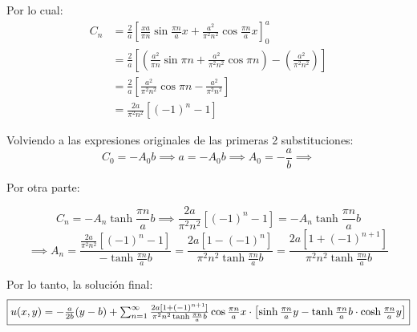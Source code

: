 \begin{solution}
Por lo cual: 
\begin{align*}
    C_n &= \frac{2}{a}\left[\frac{xa}{\pi n}\sin\frac{\pi n}{a}x+\frac{a^2}{\pi^2 n^2} \cos\frac{\pi n}{a}x \right]_0^a\\
    &= \frac{2}{a}\left[\left(\frac{a^2}{\pi n}\sin\pi n+\frac{a^2}{\pi^2 n^2} \cos\pi n\right)-\left(\frac{a^2}{\pi^2 n^2}\right) \right]\\
    &= \frac{2}{a}\left[\frac{a^2}{\pi^2 n^2} \cos\pi n-\frac{a^2}{\pi^2 n^2} \right]\\
    &= \frac{2a}{\pi^2 n^2}\left[(-1)^n-1 \right]
\end{align*}

\linita 

Volviendo a las expresiones originales de las primeras 2 substituciones: 
$$C_0 = -A_0b \implies a= -A_0 b \implies A_0=-\frac{a}{b}\implies $$
 
Por otra parte: 

$$C_n= -A_n\tanh \frac{\pi n}{a}b\implies \frac{2a}{\pi^2 n^2}\left[(-1)^n-1 \right] =-A_n\tanh \frac{\pi n}{a}b $$
$$\implies A_n= \frac{\frac{2a}{\pi^2 n^2}\left[(-1)^n-1 \right]}{-\tanh \frac{\pi n}{a}b}=\frac{2a[1-(-1)^n]}{\pi^2 n^2 \tanh \frac{\pi n}{a}b}= \frac{2a[1+(-1)^{n+1}]}{\pi^2 n^2 \tanh \frac{\pi n}{a}b}$$

\linea

Por lo tanto, la solución final: 
$$\fbox{$u(x,y)=-\frac{a}{2b}(y-b)+\sum_{n=1}^\infty \frac{2a[1+(-1)^{n+1}]}{\pi^2 n^2 \tanh \frac{\pi n}{a}b}\cos \frac{\pi n}{a}x\cdot \left[\sinh \frac{\pi n}{a}y-\tanh\frac{\pi n}{a}b\cdot \cosh \frac{\pi n}{a} y \right]$}$$

\end{solution}
